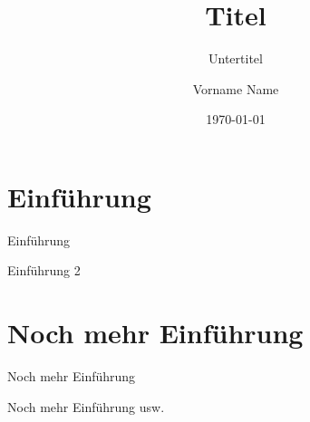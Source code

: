 \documentclass{f4_beamer}
\title{Titel}
\subtitle{Untertitel}
\author{Vorname Name}
\date{\today}
\begin{document}
\section{Einführung}

\begin{frame}{Einführung}

\end{frame}

\begin{frame}{Einführung 2}

\end{frame}

\section{Noch mehr Einführung}

\begin{frame}{Noch mehr Einführung}

\end{frame}

\begin{frame}{Noch mehr Einführung  usw.}

\end{frame}
\end{document}
